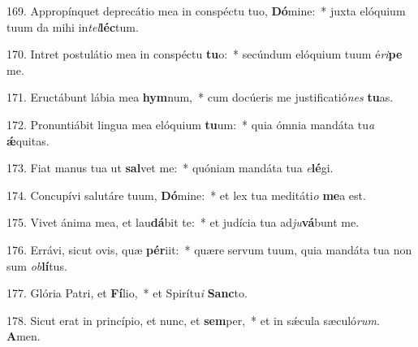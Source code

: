 169. Appropínquet deprecátio mea in conspéctu tuo, \textbf{Dó}mine:~*  juxta elóquium tuum da mihi in\textit{tel}\textbf{léc}tum.\

170. Intret postulátio mea in conspéctu \textbf{tu}o:~*  secúndum elóquium tuum é\textit{ri}\textbf{pe} me.\

171. Eructábunt lábia mea \textbf{hym}num,~*  cum docúeris me justificatió\textit{nes} \textbf{tu}as.\

172. Pronuntiábit lingua mea elóquium \textbf{tu}um:~*  quia ómnia mandáta tu\textit{a} \textbf{ǽ}quitas.\

173. Fiat manus tua ut \textbf{sal}vet me:~*  quóniam mandáta tua \textit{e}\textbf{lé}gi.\

174. Concupívi salutáre tuum, \textbf{Dó}mine:~*  et lex tua meditáti\textit{o} \textbf{me}a est.\

175. Vivet ánima mea, et lau\textbf{dá}bit te:~*  et judícia tua ad\textit{ju}\textbf{vá}bunt me.\

176. Errávi, sicut ovis, quæ \textbf{pér}iit:~*  quære servum tuum, quia mandáta tua non sum \textit{ob}\textbf{lí}tus.\

177. Glória Patri, et \textbf{Fí}lio,~*  et Spirítu\textit{i} \textbf{Sanc}to.\

178. Sicut erat in princípio, et nunc, et \textbf{sem}per,~*  et in sǽcula sæculó\textit{rum}. \textbf{A}men.\

